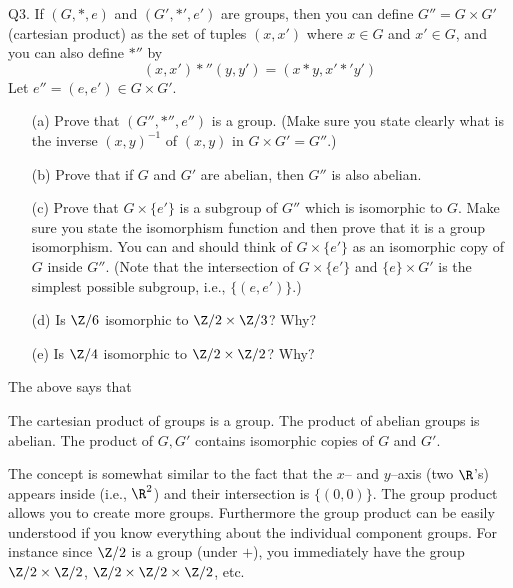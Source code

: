 \newpage
Q3. If $(G, *, e)$ and $(G', *', e')$ are groups, then you can define
$G'' = G \times G'$ (cartesian product)
as the set of tuples $(x, x')$ where $x \in G$ and
$x' \in G$, and you can also define $*''$ by
\[
(x,x') *'' (y,y') = (x * y, x' *' y') 
\]
Let $e'' = (e, e') \in G \times G'$.
\begin{enumerate}[nosep]
\item[(a)] Prove that $(G'', *'', e'')$ is a group.
(Make sure you state clearly what is the inverse
$(x, y)^{-1}$ of $(x, y)$ in $G \times G' = G''$.)
\item[(b)] Prove that if $G$ and $G'$ are abelian, then $G''$ is also abelian.
\item[(c)] Prove that $G \times \{e'\}$ is a subgroup of $G''$ which is
isomorphic to $G$. Make sure you state the isomorphism function and then
prove that it is a group isomorphism.
You can and should think of $G \times \{e'\}$ as an isomorphic copy of
$G$ inside $G''$.
(Note that the intersection of $G \times \{e'\}$ and $\{e\} \times G'$
is the simplest possible subgroup, i.e., $\{(e, e')\}$.)
\item[(d)] Is $\Z/6$ isomorphic to $\Z/2 \times \Z/3$? Why?
\item[(e)] Is $\Z/4$ isomorphic to $\Z/2 \times \Z/2$? Why?
\end{enumerate}
The above says that
\begin{enumerate}[nosep]
\li The cartesian product of groups is a group.
\li The product of abelian groups is abelian.
\li The product of $G, G'$ contains isomorphic copies of $G$ and $G'$.
\end{enumerate}
The concept
is somewhat similar to the fact that the $x$-- and $y$--axis (two $\R$'s)
appears inside (i.e., $\R^2$) and their intersection is $\{(0,0)\}$.
The group product allows you to create more groups.
Furthermore the group product can be easily understood if you
know everything about the individual component groups.
For instance since $\Z/2$ is a group (under $+$), you immediately
have the group $\Z/2 \times \Z/2$, $\Z/2 \times \Z/2 \times \Z/2$, etc.

\SOLUTION



